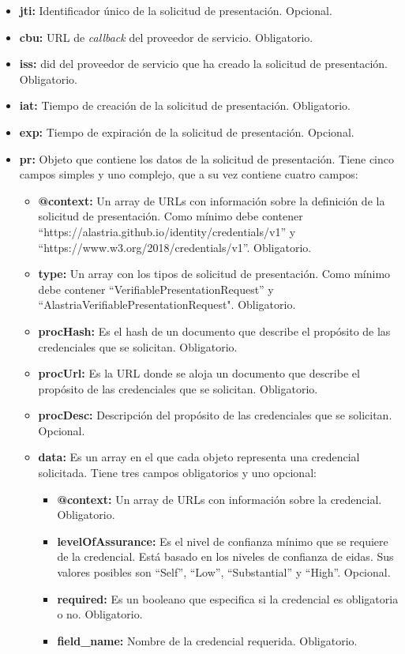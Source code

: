 \begin{itemize}
    \item \textbf{jti:} Identificador único de la solicitud de presentación. Opcional.
    \item \textbf{cbu:} URL de \textit{callback} del proveedor de servicio. Obligatorio.
    \item \textbf{iss:} \acrshort{did} del proveedor de servicio que ha creado la solicitud de presentación. Obligatorio.
    \item \textbf{iat:} Tiempo de creación de la solicitud de presentación. Obligatorio.
    \item \textbf{exp:} Tiempo de expiración de la solicitud de presentación. Opcional.
    \item \textbf{pr:} Objeto que contiene los datos de la solicitud de presentación. Tiene cinco campos simples y uno complejo, que a su vez contiene cuatro campos:
    \begin{itemize}
        \item \textbf{@context:} Un array de URLs con información sobre la definición de la solicitud de presentación. Como mínimo debe contener\\
        ``https://alastria.github.io/identity/credentials/v1'' y \\
        ``https://www.w3.org/2018/credentials/v1''. Obligatorio.
        \item \textbf{type:} Un array con los tipos de solicitud de presentación. Como mínimo debe contener ``VerifiablePresentationRequest'' y\\ ``AlastriaVerifiablePresentationRequest". Obligatorio.
        \item \textbf{procHash:} Es el hash de un documento que describe el propósito de las credenciales que se solicitan. Obligatorio.
        \item \textbf{procUrl:} Es la URL donde se aloja un documento que describe el propósito de las credenciales que se solicitan. Obligatorio. 
        \item \textbf{procDesc:} Descripción del propósito de las credenciales que se solicitan. Opcional.
        \item \textbf{data:} Es un array en el que cada objeto representa una credencial solicitada. Tiene tres campos obligatorios y uno opcional:
        \begin{itemize}
            \item \textbf{@context:} Un array de URLs con información sobre la credencial. Obligatorio.
            \item \textbf{levelOfAssurance:} Es el nivel de confianza mínimo que se requiere de la credencial. Está basado en los niveles de confianza de \acrshort{eidas}. Sus valores posibles son ``Self'', ``Low'', ``Substantial'' y ``High''. Opcional.
            \item \textbf{required:} Es un booleano que especifica si la credencial es obligatoria o no. Obligatorio.
            \item \textbf{field\_name:} Nombre de la credencial requerida. Obligatorio.
        \end{itemize}
    \end{itemize}
\end{itemize}
